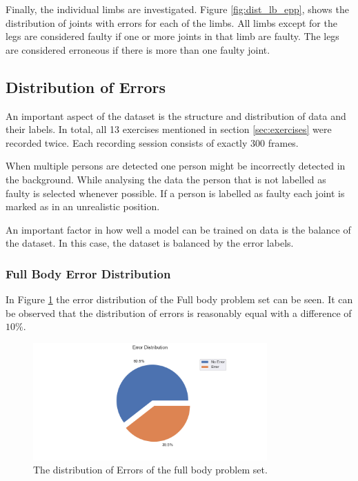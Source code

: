 Finally, the individual limbs are investigated. Figure \ref{fig:dist_lb_epp}, shows the distribution of joints with errors for each of the limbs. All limbs except for the legs are considered faulty if one or more joints in that limb are faulty. The legs are considered erroneous if there is more than one faulty joint.


\subsection{Distribution of Errors}

An important aspect of the dataset is the structure and distribution of data and their labels. In total, all 13 exercises mentioned in section \ref{sec:exercises} were recorded twice. Each recording session consists of exactly 300 frames.

When multiple persons are detected one person might be incorrectly detected in the background. While analysing the data the person that is not labelled as faulty is selected whenever possible. If a person is labelled as faulty each joint is marked as in an unrealistic position.

An important factor in how well a model can be trained on data is the balance of the dataset. In this case, the dataset is balanced by the error labels. 

\subsubsection{Full Body Error Distribution}

In Figure \ref{fig:fb_pie} the error distribution of the Full body problem set can be seen. It can be observed that the distribution of errors is reasonably equal with a difference of $10\%$. 

\begin{figure}[ht]
  \centering
  \includegraphics[width=0.8\textwidth]{figures/Data/dist_full_body/Error_Distribution_by_Body_Half.png}
  \caption[Error Distribution of the Full Body]{The distribution of Errors of the full body problem set.}
  \label{fig:fb_pie}
\end{figure}

